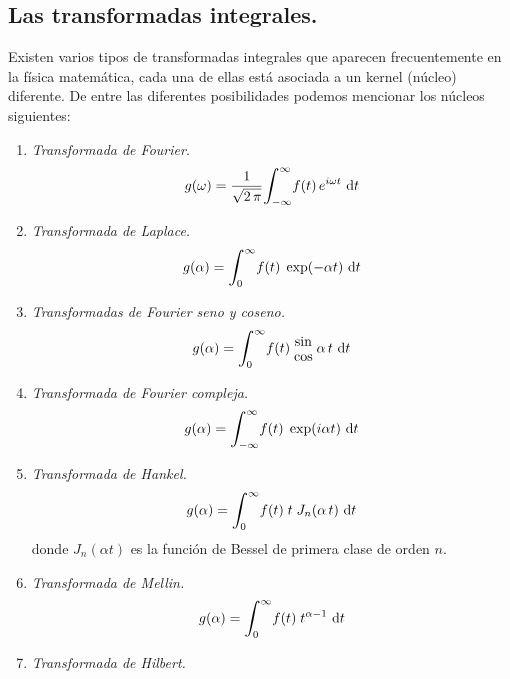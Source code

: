 \subsection{Las transformadas integrales.}

Existen varios tipos de transformadas integrales que aparecen frecuentemente en la física matemática, cada una de ellas está asociada a un kernel (núcleo) diferente. De entre las diferentes posibilidades podemos mencionar los núcleos siguientes:
\begin{enumerate}
\item \emph{Transformada de Fourier.}
\begin{align}
g (\omega) = \dfrac{1}{\sqrt{2 \, \pi}} \scaleint{6ex}_{\bs -\infty}^{\infty} f(t) \, e^{i \omega t} \, \dd{t}
\label{eq:ecuacion_07_01}
\end{align}
\item \emph{Transformada de Laplace.}
\begin{align}
g (\alpha)= \scaleint{6ex}_{\bs 0}^{\infty} f(t) \; \exp(-\alpha t) \, \dd{t}
\label{eq:ecuacion_7_02}
\end{align}
\item \emph{Transformadas de Fourier seno y coseno.}
\begin{align}
g (\alpha)= \scaleint{6ex}_{\bs 0}^{\infty} f(t) \; \substack{ \textstyle \sin \\[0.5em] \textstyle \cos} \; \alpha \, t \,  \dd{t}
\label{eq:ecuacion_7_03}
\end{align}
\item \emph{Transformada de Fourier compleja.}
\begin{align}
g (\alpha)= \scaleint{6ex}_{\bs -\infty}^{\infty} f(t) \; \exp(i \alpha t) \, \dd{t}
\label{eq:ecuacion_7_04}
\end{align}
\item \emph{Transformada de Hankel.}
\begin{align}
g (\alpha)= \scaleint{6ex}_{\bs 0}^{\infty} f(t) \; t \; J_{n} (\alpha \, t) \, \dd{t}
\label{eq:ecuacion_7_05}
\end{align}
donde $J_{n}(\alpha t)$ es la función de Bessel de primera clase de orden $n$.
\item \emph{Transformada de Mellin.}
\begin{align}
g (\alpha)= \scaleint{6ex}_{\bs 0}^{\infty} f(t) \; t^{\alpha-1} \, \dd{t}
\label{eq:ecuacion_7_06}
\end{align}
\item \emph{Transformada de Hilbert.}

\end{enumerate}

